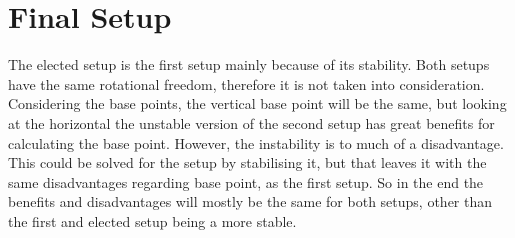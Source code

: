 \section{Final Setup}
The elected setup is the first setup mainly because of its stability. Both setups have the same rotational freedom, therefore it is not taken into consideration. Considering the base points, the vertical base point will be the same, but looking at the horizontal the unstable version of the second setup has great benefits for calculating the base point. However, the instability is to much of a disadvantage. This could be solved for the setup by stabilising it, but that leaves it with the same disadvantages regarding base point, as the first setup. So in the end the benefits and disadvantages will mostly be the same for both setups, other than the first and elected setup being a more stable.